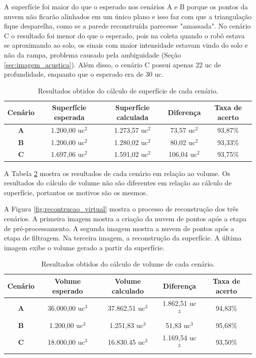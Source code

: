 A superfície foi maior do que o esperado nos cenários A e B porque os pontos da nuvem não ficarão alinhados em um único plano e isso faz com que a triangulação fique desparelha, como se a parede reconstruída parecesse "amassada".
No cenário C o resultado foi menor do que o esperado, pois na coleta quando o robô estava se aproximando ao solo, os sinais com maior intensidade estavam vindo do solo e não da rampa, problema causado pela ambiguidade (Seção \ref{sec:imagem_acustica}).
Além disso, o cenário C possui apenas 22 uc de profundidade, enquanto que o esperado era de 30 uc.

\begin{table}[H]
    \centering
    \caption{Resultados obtidos do cálculo de superfície de cada cenário.}
    \begin{tabular}{@{}ccccc@{}}
        \toprule
        \textbf{Cenário} & \textbf{Superfície esperada} & \textbf{Superfície calculada} & \textbf{Diferença} & \textbf{Taxa de acerto} \\ \midrule
        \textbf{A} & 1.200,00 uc$^2$ & 1.273,57 uc$^2$ & 73,57 uc$^2$ & 93,87\% \\
        \textbf{B} & 1.200,00 uc$^2$ & 1.280,02 uc$^2$ & 80,02 uc$^2$ & 93,33\% \\
        \textbf{C} & 1.697,06 uc$^2$ & 1.591,02 uc$^2$ & 106,04 uc$^2$ & 93,75\% \\ \bottomrule
    \end{tabular}
    \label{tab:tabela_result_cenarios_sup}
\end{table}

A Tabela \ref{tab:tabela_result_cenarios_vol} mostra os resultados de cada cenário em relação ao volume.
Os resultados do cálculo de volume não são diferentes em relação ao cálculo de superfície, portantos os motivos são os mesmos.

A Figura \ref{fig:recontrucao_virtual} mostra o processo de reconstrução dos três cenários. 
A primeira imagem mostra a criação da nuvem de pontos após a etapa de pré-processamento.
A segunda imagem mostra a nuvem de pontos após a etapa de filtragem.
Na terceira imagem, a reconstrução da superfície.
A última imagem exibe o volume gerado a partir da superfície.

\begin{table}[H]
    \centering
    \caption{Resultados obtidos do cálculo de volume de cada cenário.}
    \begin{tabular}{@{}ccccc@{}}
        \toprule
        \textbf{Cenário} & \textbf{Volume esperado} & \textbf{Volume calculado} & \textbf{Diferença} & \textbf{Taxa de acerto} \\ \midrule
        \textbf{A} & 36.000,00 uc$^3$ & 37.862,51 uc$^3$ & 1.862,51 uc$^3$ & 94,83\% \\
        \textbf{B} & 1.200,00 uc$^3$ & 1.251,83 uc$^3$ & 51,83 uc$^3$ & 95,68\% \\
        \textbf{C} & 18.000,00 uc$^3$ & 16.830.45 uc$^3$ & 1.169,54 uc$^3$ & 93,50\% \\ \bottomrule
    \end{tabular}
    \label{tab:tabela_result_cenarios_vol}
\end{table}


